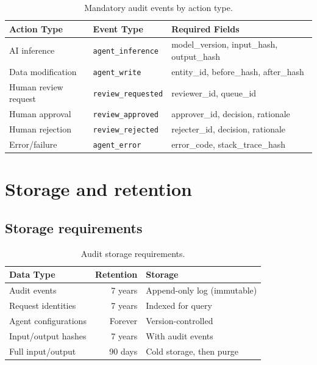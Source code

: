 \documentclass[11pt,a4paper,twoside]{report}
\begin{document}
\begin{table}[htbp]
\centering
\caption{Mandatory audit events by action type.}
\label{tab:audit-events}
\footnotesize
\begin{tabularx}{\linewidth}{@{}l l X@{}}
\toprule
\textbf{Action Type} & \textbf{Event Type} & \textbf{Required Fields} \\ \midrule
AI inference & \texttt{agent\_inference} & model\_version, input\_hash, output\_hash \\
Data modification & \texttt{agent\_write} & entity\_id, before\_hash, after\_hash \\
Human review request & \texttt{review\_requested} & reviewer\_id, queue\_id \\
Human approval & \texttt{review\_approved} & approver\_id, decision, rationale \\
Human rejection & \texttt{review\_rejected} & rejecter\_id, decision, rationale \\
Error/failure & \texttt{agent\_error} & error\_code, stack\_trace\_hash \\
\bottomrule
\end{tabularx}
\end{table}

\section{Storage and retention}

\subsection{Storage requirements}

\begin{table}[htbp]
\centering
\caption{Audit storage requirements.}
\label{tab:audit-storage}
\footnotesize
\begin{tabularx}{\linewidth}{@{}l r X@{}}
\toprule
\textbf{Data Type} & \textbf{Retention} & \textbf{Storage} \\ \midrule
Audit events & 7 years & Append-only log (immutable) \\
Request identities & 7 years & Indexed for query \\
Agent configurations & Forever & Version-controlled \\
Input/output hashes & 7 years & With audit events \\
Full input/output & 90 days & Cold storage, then purge \\
\bottomrule
\end{tabularx}
\end{table}
\end{document}
